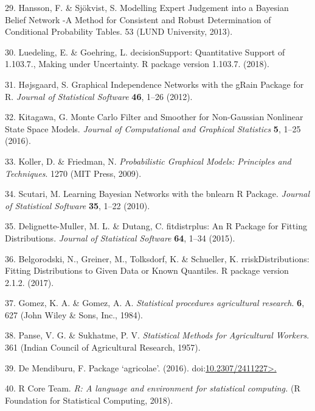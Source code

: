 \documentclass[11pt,preprint]{article}
\begin{document}
\leavevmode\hypertarget{ref-Hansson_and_Sjokvist_2013}{}%
29. Hansson, F. \& Sjökvist, S. Modelling Expert Judgement into a
Bayesian Belief Network -A Method for Consistent and Robust
Determination of Conditional Probability Tables. 53 (LUND University,
2013).

\leavevmode\hypertarget{ref-Luedeling_and_Goehring_2018}{}%
30. Luedeling, E. \& Goehring, L. decisionSupport: Quantitative Support
of 1.103.7., Making under Uncertainty. R package version 1.103.7.
(2018).

\leavevmode\hypertarget{ref-Hojsgaard_2012}{}%
31. Højsgaard, S. Graphical Independence Networks with the gRain Package
for R. \emph{Journal of Statistical Software} \textbf{46}, 1--26 (2012).

\leavevmode\hypertarget{ref-Kitagawa_2016}{}%
32. Kitagawa, G. Monte Carlo Filter and Smoother for Non-Gaussian
Nonlinear State Space Models. \emph{Journal of Computational and
Graphical Statistics} \textbf{5}, 1--25 (2016).

\leavevmode\hypertarget{ref-Koller_and_Friedman_2009}{}%
33. Koller, D. \& Friedman, N. \emph{Probabilistic Graphical Models:
Principles and Techniques}. 1270 (MIT Press, 2009).

\leavevmode\hypertarget{ref-Scutari_2010}{}%
34. Scutari, M. Learning Bayesian Networks with the bnlearn R Package.
\emph{Journal of Statistical Software} \textbf{35}, 1--22 (2010).

\leavevmode\hypertarget{ref-Delignette-Muller_and_Dutang_2015}{}%
35. Delignette-Muller, M. L. \& Dutang, C. fitdistrplus: An R Package
for Fitting Distributions. \emph{Journal of Statistical Software}
\textbf{64}, 1--34 (2015).

\leavevmode\hypertarget{ref-Belgorodski_et_al_2017}{}%
36. Belgorodski, N., Greiner, M., Tolksdorf, K. \& Schueller, K.
rriskDistributions: Fitting Distributions to Given Data or Known
Quantiles. R package version 2.1.2. (2017).

\leavevmode\hypertarget{ref-Gomez_and_Gomez_1984}{}%
37. Gomez, K. A. \& Gomez, A. A. \emph{Statistical procedures
agricultural research}. \textbf{6}, 627 (John Wiley \& Sons, Inc.,
1984).

\leavevmode\hypertarget{ref-Panse_and_Sukhatme_1957}{}%
38. Panse, V. G. \& Sukhatme, P. V. \emph{Statistical Methods for
Agricultural Workers}. 361 (Indian Council of Agricultural Research,
1957).

\leavevmode\hypertarget{ref-DeMendiburu_2016}{}%
39. De Mendiburu, F. Package `agricolae'. (2016).
doi:\href{https://doi.org/10.2307/2411227\%3E.}{10.2307/2411227\textgreater.}

\leavevmode\hypertarget{ref-RCoreTeam_2018}{}%
40. R Core Team. \emph{R: A language and environment for statistical
computing.} (R Foundation for Statistical Computing, 2018).
\end{document}
